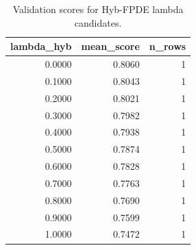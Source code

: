 \begin{table}[t]
\caption{Validation scores for Hyb-FPDE lambda candidates.}
\label{tab:lambda_distribution_computed}
\centering
\begin{tabular}{rrr}
\toprule
lambda\_hyb & mean\_score & n\_rows \\
\midrule
0.0000 & 0.8060 & 1 \\
0.1000 & 0.8043 & 1 \\
0.2000 & 0.8021 & 1 \\
0.3000 & 0.7982 & 1 \\
0.4000 & 0.7938 & 1 \\
0.5000 & 0.7874 & 1 \\
0.6000 & 0.7828 & 1 \\
0.7000 & 0.7763 & 1 \\
0.8000 & 0.7690 & 1 \\
0.9000 & 0.7599 & 1 \\
1.0000 & 0.7472 & 1 \\
\bottomrule
\end{tabular}

\end{table}
